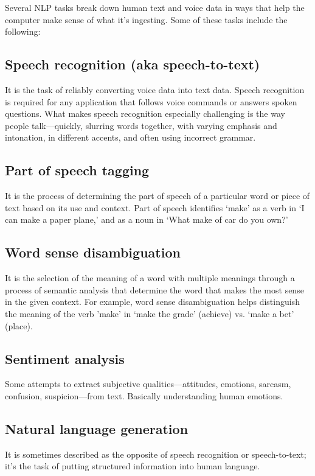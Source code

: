 \documentclass[11pt]{article}
\begin{document}
Several NLP tasks break down human text and voice data in ways that help the computer
make sense of what it's ingesting. Some of these tasks include the following:

\subsection{Speech recognition (aka speech-to-text)}
\label{sec:org31b07c8}
It is the task of reliably converting voice data into text data.
Speech recognition is required for any application that follows voice commands or
answers spoken questions. What makes speech recognition especially challenging is
the way people talk—quickly, slurring words together, with varying emphasis and
intonation, in different accents, and often using incorrect grammar.

\subsection{Part of speech tagging}
\label{sec:org4a72491}
It is the process of determining the part of speech of a particular word or
piece of text based on its use and context. Part of speech identifies ‘make’ as a
verb in ‘I can make a paper plane,’ and as a noun in ‘What make of car do you own?’

\subsection{Word sense disambiguation}
\label{sec:org2f109c1}
It is the selection of the meaning of a word with multiple meanings through a process
of semantic analysis that determine the word that makes the most sense in the given
context. For example, word sense disambiguation helps distinguish the meaning of the
verb 'make' in ‘make the grade’ (achieve) vs. ‘make a bet’ (place).

\subsection{Sentiment analysis}
\label{sec:orgd23d73d}
Some attempts to extract subjective qualities—attitudes, emotions, sarcasm, confusion,
suspicion—from text. Basically understanding human emotions.

\subsection{Natural language generation}
\label{sec:org7543635}
It is sometimes described as the opposite of speech recognition or speech-to-text;
it's the task of putting structured information into human language. 
\end{document}
